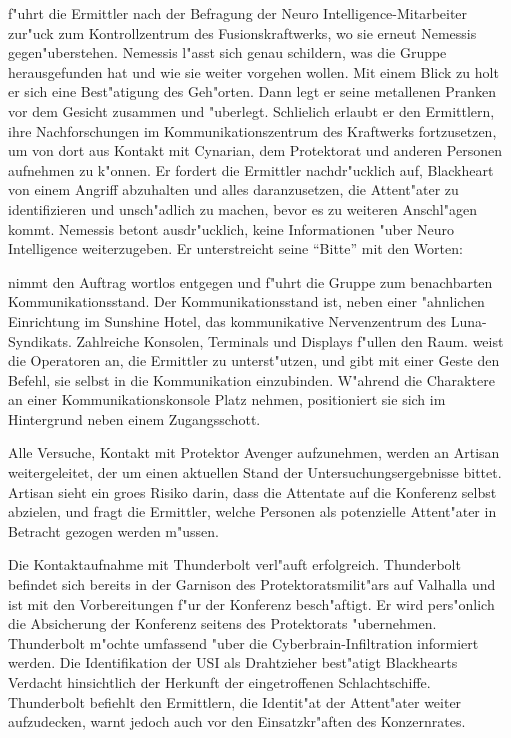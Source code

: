 \xl{} f"uhrt die Ermittler nach der Befragung der Neuro Intelligence-Mitarbeiter zur"uck zum Kontrollzentrum des Fusionskraftwerks, wo sie erneut Nemessis gegen"uberstehen. Nemessis l"asst sich genau schildern, was die Gruppe herausgefunden hat und wie sie weiter vorgehen wollen. Mit einem Blick zu \xl{} holt er sich eine Best"atigung des Geh"orten. Dann legt er seine metallenen Pranken vor dem Gesicht zusammen und "uberlegt. Schlie\3lich erlaubt er den Ermittlern, ihre Nachforschungen im Kommunikationszentrum des Kraftwerks fortzusetzen, um von dort aus Kontakt mit Cynarian, dem Protektorat und anderen Personen aufnehmen zu k"onnen. Er fordert die Ermittler nachdr"ucklich auf, Blackheart von einem Angriff abzuhalten und alles daranzusetzen, die Attent"ater zu identifizieren und unsch"adlich zu machen, bevor es zu weiteren Anschl"agen kommt. Nemessis betont ausdr"ucklich, keine Informationen "uber Neuro Intelligence weiterzugeben. Er unterstreicht seine "`Bitte"' mit den Worten:


\xl{} nimmt den Auftrag wortlos entgegen und f"uhrt die Gruppe zum benachbarten Kommunikationsstand. Der Kommunikationsstand ist, neben einer "ahnlichen Einrichtung im Sunshine Hotel, das kommunikative Nervenzentrum des Luna-Syndikats. Zahlreiche Konsolen, Terminals und Displays f"ullen den Raum. \xl{} weist die Operatoren an, die Ermittler zu unterst"utzen, und gibt mit einer Geste den Befehl, sie selbst in die Kommunikation einzubinden. W"ahrend die Charaktere an einer Kommunikationskonsole Platz nehmen, positioniert sie sich im Hintergrund neben einem Zugangsschott.

Alle Versuche, Kontakt mit Protektor Avenger aufzunehmen, werden an Artisan weitergeleitet, der um einen aktuellen Stand der Untersuchungsergebnisse bittet. Artisan sieht ein gro\3es Risiko darin, dass die Attentate auf die Konferenz selbst abzielen, und fragt die Ermittler, welche Personen als potenzielle Attent"ater in Betracht gezogen werden m"ussen.

Die Kontaktaufnahme mit Thunderbolt verl"auft erfolgreich. Thunderbolt befindet sich bereits in der Garnison des Protektoratsmilit"ars auf Valhalla und ist mit den Vorbereitungen f"ur der Konferenz besch"aftigt. Er wird pers"onlich die Absicherung der Konferenz seitens des Protektorats "ubernehmen. Thunderbolt m"ochte umfassend "uber die Cyberbrain-Infiltration informiert werden. Die Identifikation der USI als Drahtzieher best"atigt Blackhearts Verdacht hinsichtlich der Herkunft der eingetroffenen Schlachtschiffe. Thunderbolt befiehlt den Ermittlern, die Identit"at der Attent"ater weiter aufzudecken, warnt jedoch auch vor den Einsatzkr"aften des Konzernrates. 

